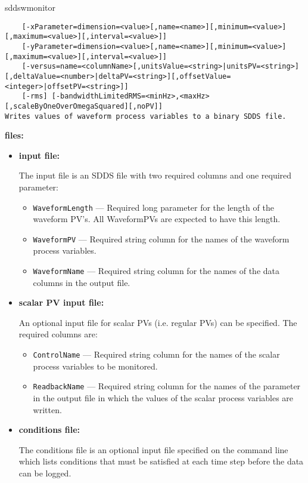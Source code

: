 \begin{sddsprog}{sddswmonitor}
\begin{verbatim}
    [-xParameter=dimension=<value>[,name=<name>][,minimum=<value>][,maximum=<value>][,interval=<value>]]
    [-yParameter=dimension=<value>[,name=<name>][,minimum=<value>][,maximum=<value>][,interval=<value>]]
    [-versus=name=<columnName>[,unitsValue=<string>|unitsPV=<string>][,deltaValue=<number>|deltaPV=<string>][,offsetValue=<integer>|offsetPV=<string>]]
    [-rms] [-bandwidthLimitedRMS=<minHz>,<maxHz>[,scaleByOneOverOmegaSquared][,noPV]]
Writes values of waveform process variables to a binary SDDS file.
\end{verbatim}
\item \textbf{files:}
\begin{itemize}
  \item \textbf{input file:}\par
The input file is an SDDS file with two required columns and one required parameter:
  \begin{itemize}
    \item {\verb+WaveformLength+} --- Required long parameter for the length of the waveform PV's. All
                WaveformPVs are expected to have this length.
    \item {\verb+WaveformPV+}  --- Required string column for the names of the waveform process variables.
    \item {\verb+WaveformName+} --- Required string column for the names of the data columns in the output file.
  \end{itemize}

  \item \textbf{scalar PV input file:}\par
An optional input file for scalar PVs (i.e. regular PVs) can be specified. The required columns are:
  \begin{itemize}
    \item {\tt ControlName} --- Required string column for the names of the scalar process variables
                to be monitored.
    \item {\tt ReadbackName} --- Required string column for the names of the parameter in the
                output file in which the values of the scalar process variables are written.
  \end{itemize}

  \item \textbf{conditions file:} \par
The conditions file is an optional input file specified on the command line which lists
conditions that must be satisfied at each time step before the data can be logged.


\end{itemize}
\end{sddsprog}

